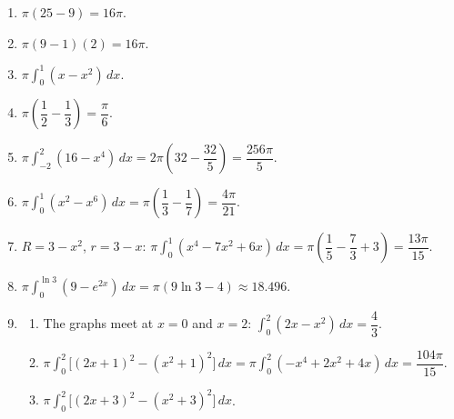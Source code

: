 \documentclass[11pt]{article}
\begin{document}
\newpage
\begin{solbox}
\begin{enumerate}[leftmargin=*,itemsep=4pt]
  \item $\pi(25-9)=16\pi$.
  \item $\pi(9-1)(2)=16\pi$.
  \item $\pi\displaystyle\int_{0}^{1}(x-x^2)\,dx$.
  \item $\pi\left(\dfrac12-\dfrac13\right)=\dfrac\pi6$.
  \item $\pi\displaystyle\int_{-2}^{2}(16-x^4)\,dx=2\pi\left(32-\dfrac{32}{5}\right)=\dfrac{256\pi}{5}$.
  \item $\pi\displaystyle\int_{0}^{1}(x^2-x^6)\,dx=\pi\left(\dfrac13-\dfrac17\right)=\dfrac{4\pi}{21}$.
  \item $R=3-x^2$, $r=3-x$: $\pi\displaystyle\int_{0}^{1}(x^4-7x^2+6x)\,dx=\pi\left(\dfrac15-\dfrac73+3\right)=\dfrac{13\pi}{15}$.
  \item $\pi\displaystyle\int_{0}^{\ln3}(9-e^{2x})\,dx=\pi(9\ln3-4)\approx18.496$.
  \item \begin{enumerate}[label=(\alph*),leftmargin=*,itemsep=3pt]
    \item The graphs meet at $x=0$ and $x=2$: $\displaystyle\int_{0}^{2}(2x-x^2)\,dx=\dfrac43$.
    \item $\pi\displaystyle\int_{0}^{2}\big[(2x+1)^2-(x^2+1)^2\big]\,dx=\pi\displaystyle\int_{0}^{2}(-x^4+2x^2+4x)\,dx=\dfrac{104\pi}{15}$.
    \item $\pi\displaystyle\int_{0}^{2}\big[(2x+3)^2-(x^2+3)^2\big]\,dx$.
  \end{enumerate}
\end{enumerate}
\end{solbox}
\end{document}
